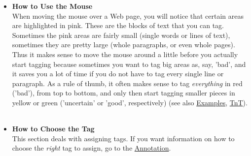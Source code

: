\documentclass[12pt,a4paper]{article}
\begin{document}
\begin{itemize}
	\item {\large \textbf{How to Use the Mouse}}\\
When moving the mouse over a Web page, you will notice that certain areas are highlighted in pink. These are the blocks of text that you can tag. Sometimes the pink areas are fairly small (single words or lines of text), sometimes they are pretty large (whole paragraphs, or even whole pages). Thus it makes sense to move the mouse around a little before you actually start tagging because sometimes you want to tag big areas as, say, 'bad', and it saves you a lot of time if you do not have to tag every single line or paragraph. As a rule of thumb, it often makes sense to tag \emph{everything} in red ('bad'), from top to bottom, and only then start tagging smaller pieces in yellow or green ('uncertain' or 'good', respectively) (see also \hyperref{Examples}{Examples, described in~}{}{Examples}, \hyperref{Tips \& Tricks}{Tips \& Tricks, ~}{}{TnT}).\\ \\


	\item {\large \textbf{How to Choose the Tag}}\\

This section deals with assigning tags. If you want information on how to choose the \emph{right} tag to assign, go to the \hyperref{Annotation Guidelines}{Annotation Guidelines in ~}{}{Annotation}. \\


\end{itemize}
\end{document}
